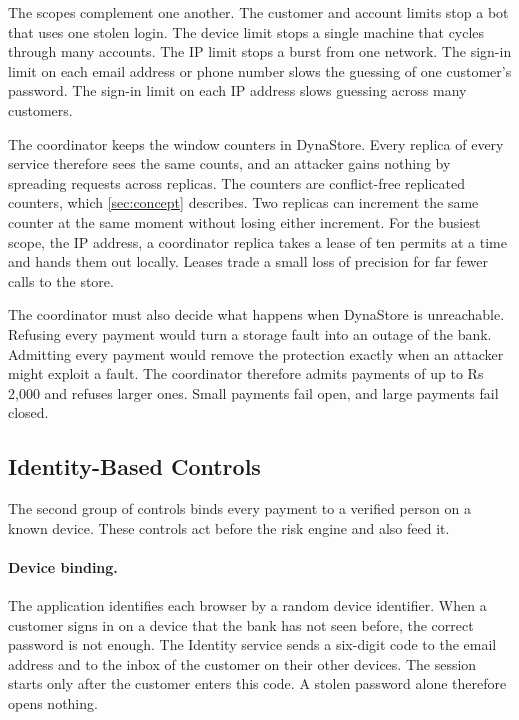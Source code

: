 \documentclass[11pt,a4paper]{article}
\begin{document}
The scopes complement one another. The customer and account limits stop a bot that uses one stolen login. The device limit stops a single machine that cycles through many accounts. The IP limit stops a burst from one network. The sign-in limit on each email address or phone number slows the guessing of one customer's password. The sign-in limit on each IP address slows guessing across many customers.

The coordinator keeps the window counters in DynaStore. Every replica of every service therefore sees the same counts, and an attacker gains nothing by spreading requests across replicas. The counters are conflict-free replicated counters, which \cref{sec:concept} describes. Two replicas can increment the same counter at the same moment without losing either increment. For the busiest scope, the IP address, a coordinator replica takes a lease of ten permits at a time and hands them out locally. Leases trade a small loss of precision for far fewer calls to the store.

The coordinator must also decide what happens when DynaStore is unreachable. Refusing every payment would turn a storage fault into an outage of the bank. Admitting every payment would remove the protection exactly when an attacker might exploit a fault. The coordinator therefore admits payments of up to Rs 2,000 and refuses larger ones. Small payments fail open, and large payments fail closed.

\subsection{Identity-Based Controls}
\label{sec:identity-controls}

The second group of controls binds every payment to a verified person on a known device. These controls act before the risk engine and also feed it.

\paragraph{Device binding.} The application identifies each browser by a random device identifier. When a customer signs in on a device that the bank has not seen before, the correct password is not enough. The Identity service sends a six-digit code to the email address and to the inbox of the customer on their other devices. The session starts only after the customer enters this code. A stolen password alone therefore opens nothing.
\end{document}
